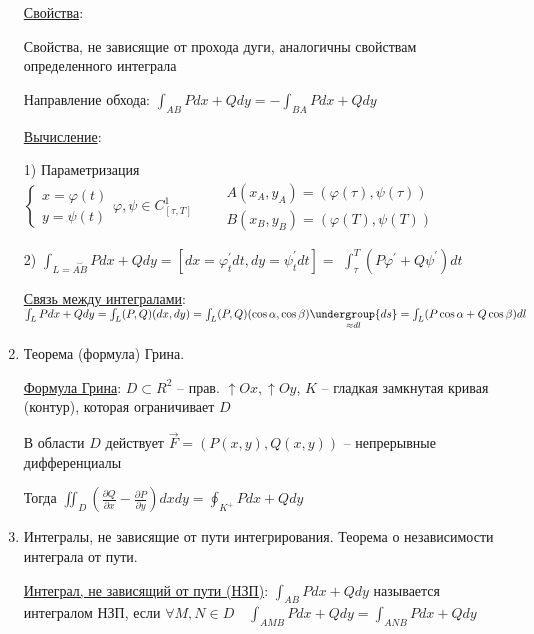 \documentclass[12pt]{article}
\begin{document}
\begin{enumerate}
        \hyperlink{curvilinearintegraloffirstkindproperties}{Свойства}:

        Свойства, не зависящие от прохода дуги, аналогичны свойствам определенного интеграла

        Направление обхода: $\int_{AB}Pdx + Qdy = -\int_{BA}Pdx + Qdy$

        \hyperlink{curvilinearintegraloffirstkindcalculation}{Вычисление}:

        1) Параметризация $\begin{cases}
            x = \varphi(t) \\
            y = \psi(t)
        \end{cases} \varphi, \psi \in C^1_{[\tau, T]} \quad\quad \begin{matrix}
            A(x_A, y_A) = (\varphi(\tau), \psi(\tau)) \\
            B(x_B, y_B) = (\varphi(T), \psi(T))
        \end{matrix}$

        2) $\int_{L = \overset{\smile}{AB}}Pdx + Qdy = [dx = \varphi_t^\prime dt, dy = \psi_t^\prime dt] = $
        $\int_\tau^T (P\varphi^\prime + Q\psi^\prime)dt$


        \hyperlink{connectionbetweencurvilinearintegrals}{Связь между интегралами}: $\int_L Pdx + Qdy = \int_L (P, Q)(dx, dy) = \int_L (P, Q) (\cos\alpha, \cos\beta) \underset{\approx dl}{\undergroup{ds}} = \int_L (P\cos\alpha + Q\cos\beta)dl$

        \item Теорема (формула) Грина.

        \hyperlink{formulaGreen}{Формула Грина}: $D \subset R^2$ -- прав. $\uparrow Ox, \uparrow Oy$, $K$ -- гладкая замкнутая кривая (контур), которая ограничивает $D$

        В области $D$ действует $\overrightarrow{F} = (P(x, y), Q(x, y))$ -- непрерывные дифференциалы

        Тогда $\iint_D \left(\frac{\partial Q}{\partial x} - \frac{\partial P}{\partial y}\right) dxdy = \oint_{K^+} Pdx + Qdy$

        \item Интегралы, не зависящие от пути интегрирования. Теорема о независимости интеграла от пути.

        \hyperlink{pathindependentintegrals}{Интеграл, не зависящий от пути (НЗП)}: $\int_{AB}Pdx + Qdy$ называется интегралом НЗП, если $\forall M, N \in D \quad \int_{AMB}Pdx + Qdy = \int_{ANB}Pdx + Qdy$


\end{enumerate}
\end{document}

